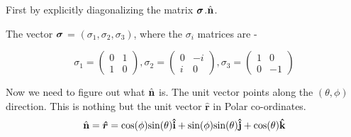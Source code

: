 



\begin{alphaparts}

\questionpart First by explicitly diagonalizing the matrix $\boldsymbol{\sigma}$.$\hat{\textbf{n}}$.

The vector $\boldsymbol{\sigma}$ = $(\sigma_{1}, \sigma_{2}, \sigma_{3})$, where the $\sigma_{i}$ matrices are -

\begin{equation*}
    \sigma_{1} = 
    \begin{pmatrix}
        0 & 1 \\
        1 & 0
    \end{pmatrix},
    \sigma_{2} = 
    \begin{pmatrix}
        0 & -i \\
        i & 0
    \end{pmatrix},
    \sigma_{3} = 
    \begin{pmatrix}
        1 & 0 \\
        0 & -1
    \end{pmatrix}
\end{equation*}

Now we need to figure out what $\hat{\textbf{n}}$ is. The unit vector points along the $(\theta, \phi)$ direction. This is nothing but the unit vector $\hat{\mathbf{r}}$ in Polar co-ordinates.
\begin{equation*}
    \hat{\textbf{n}} = \boldsymbol{\hat{r}} = \textrm{cos}(\phi)\textrm{sin}(\theta)\mathbf{\hat{i}} + \textrm{sin}(\phi)\textrm{sin}(\theta)\mathbf{\hat{j}} + \textrm{cos}(\theta)\mathbf{\hat{k}}
\end{equation*}


\end{alphaparts}
